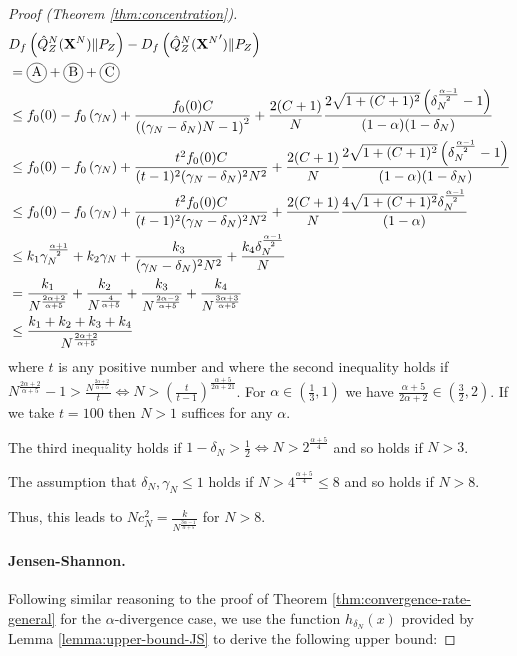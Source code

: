 \begin{proof}[Proof (Theorem \ref{thm:concentration})]
\begin{align*}
    &D_f\left( \hat{Q}_Z^N(\XN) \| P_Z\right) - D_f\left( \hat{Q}_Z^N({\XN}') \| P_Z\right) \\
    &= \encircle{A} + \encircle{B} + \encircle{C} \\
    &\leq f_0(0) - f_0\left(\gamma_N\right) + \frac{f_0(0)C}{\left((\gamma_N-\delta_N)N - 1\right)^2} + \frac{2(C+1)}{N}\frac{2\sqrt{1+(C+1)^2}\left(\delta_N^\frac{\alpha-1}{2} - 1\right)}{(1-\alpha) (1-\delta_N)} \\
    &\leq f_0(0) - f_0\left(\gamma_N\right) + \frac{t^2f_0(0)C}{(t-1)^2(\gamma_N-\delta_N)^2N^2} + \frac{2(C+1)}{N}\frac{2\sqrt{1+(C+1)^2}\left(\delta_N^\frac{\alpha-1}{2} - 1\right)}{(1-\alpha) (1-\delta_N)} \\
    &\leq f_0(0) - f_0\left(\gamma_N\right) + \frac{t^2f_0(0)C}{(t-1)^2(\gamma_N-\delta_N)^2N^2} + \frac{2(C+1)}{N}\frac{4\sqrt{1+(C+1)^2}\delta_N^\frac{\alpha-1}{2}}{(1-\alpha)} \\
    &\leq k_1 \gamma_N^{\frac{\alpha+1}{2}} + k_2 \gamma_N +\frac{k_3}{(\gamma_N-\delta_N)^2N^2} + \frac{k_4 \delta_N^\frac{\alpha-1}{2}}{N} \\
    &= \frac{k_1}{N^{\frac{2\alpha+2}{\alpha+5}}} + \frac{k_2}{N^\frac{4}{\alpha+5}} + \frac{k_3}{N^{\frac{2\alpha -2}{\alpha+5}}} +\frac{k_4}{N^{\frac{3\alpha+3}{\alpha+5}}} \\
    &\leq \frac{k_1+k_2+k_3 + k_4}{N^{\frac{2\alpha+2}{\alpha+5}}}
\end{align*}
where $t$ is any positive number and where the second inequality holds if $N^\frac{2\alpha+2}{\alpha+5} - 1 > \frac{N^\frac{2\alpha+2}{\alpha+5}}{t} \iff N > (\frac{t}{t-1})^{\frac{\alpha+5}{2\alpha+21}}$.
For $\alpha \in (\frac{1}{3}, 1)$ we have $\frac{\alpha+5}{2\alpha+2} \in (\frac{3}{2}, 2)$. 
If we take $t=100$ then $N> 1$ suffices for any $\alpha$.

The third inequality holds if $1-\delta_N > \frac{1}{2} \iff N>2^\frac{\alpha+5}{4}$ and so holds if $N>3$.

The assumption that $\delta_N, \gamma_N \leq 1$ holds if $N>4^\frac{\alpha+5}{4}\leq8$ and so holds if $N>8$.

Thus, this leads to $Nc_N^2 = \frac{k}{N^{\frac{3\alpha - 1}{\alpha+5}}}$ for $N>8$.


\paragraph{Jensen-Shannon.}

Following similar reasoning to the proof of Theorem \ref{thm:convergence-rate-general} for the $\alpha$-divergence case, we use the function $h_{\delta_N}(x)$ provided by Lemma \ref{lemma:upper-bound-JS} to derive the following upper bound:



\end{proof}
